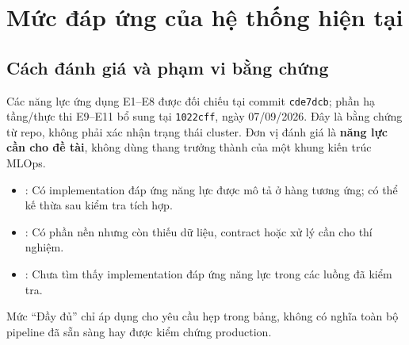 \section{Mức đáp ứng của hệ thống hiện tại}
\subsection{Cách đánh giá và phạm vi bằng chứng}
Các năng lực ứng dụng E1--E8 được đối chiếu tại commit \texttt{cde7dcb}; phần hạ tầng/thực thi E9--E11 bổ sung tại \texttt{1022cff}, ngày 07/09/2026. Đây là bằng chứng từ repo, không phải xác nhận trạng thái cluster. Đơn vị đánh giá là \textbf{năng lực cần cho đề tài}, không dùng thang trưởng thành của một khung kiến trúc MLOps.
\begin{itemize}
  \item \statusyes: Có implementation đáp ứng năng lực được mô tả ở hàng tương ứng; có thể kế thừa sau kiểm tra tích hợp.
  \item \statuspartial: Có phần nền nhưng còn thiếu dữ liệu, contract hoặc xử lý cần cho thí nghiệm.
  \item \statusno: Chưa tìm thấy implementation đáp ứng năng lực trong các luồng đã kiểm tra.
\end{itemize}
Mức “Đầy đủ” chỉ áp dụng cho yêu cầu hẹp trong bảng, không có nghĩa toàn bộ pipeline đã sẵn sàng hay được kiểm chứng production.

